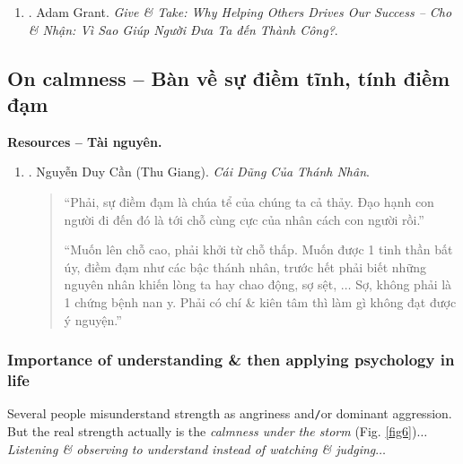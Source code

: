 \documentclass[12pt]{article}
\begin{document}
\begin{enumerate}
\begin{quotation}
		{\it``Meyer summarizes his code of honor as ``(1) Show up. (2) Work hard. (3) Be kind. (4) Take the high road.''''}
		
		-- Meyer tóm tắt quy tắc danh dự của mình là ``(1) Xuất hiện. (2) Làm việc chăm chỉ. (3) Hãy tử tế. (4) Đi đường cao tốc.
	\end{quotation}
	Với bản dịch tiếng Việt:
	\item \cite{Grant_give_take_VN}. {\sc Adam Grant}. {\it Give \& Take: Why Helping Others Drives Our Success -- Cho \& Nhận: Vì Sao Giúp Người Đưa Ta đến Thành Công?}.
\end{enumerate}

\subsection{On calmness -- Bàn về sự điềm tĩnh, tính điềm đạm}
\textbf{\textsf{Resources -- Tài nguyên.}}
\begin{enumerate}
	\item \cite{Can_dung_thanh_nhan}. {\sc Nguyễn Duy Cần (Thu Giang)}. {\it Cái Dũng Của Thánh Nhân}.
	\begin{quotation}
		``Phải, sự điềm đạm là chúa tể của chúng ta cả thảy. Đạo hạnh con người đi đến đó là tới chỗ cùng cực của nhân cách con người rồi.''
		
		``Muốn lên chỗ cao, phải khởi từ chỗ thấp. Muốn được 1 tinh thần bất úy, điềm đạm như các bậc thánh nhân, trước hết phải biết những nguyên nhân khiến lòng ta hay chao động, sợ sệt, $\ldots$ Sợ, không phải là 1 chứng bệnh nan y. Phải có chí \& kiên tâm thì làm gì không đạt được ý nguyện.''
	\end{quotation}
\end{enumerate}

\subsubsection{Importance of understanding \& then applying psychology in life}
Several people misunderstand strength as angriness and{\tt/}or dominant aggression. But the real strength actually is the {\it calmness under the storm} (Fig. \ref{fig6})$\ldots$ {\it Listening \& observing to understand instead of watching \& judging}$\ldots$
\end{document}

